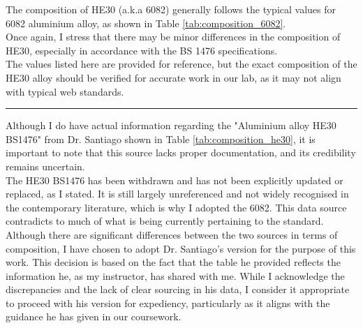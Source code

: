\documentclass{article}
\begin{document}
\hfill
\begin{minipage}{0.55\textwidth}
    The composition of HE30 (a.k.a 6082) generally follows the typical values for 6082 aluminium alloy, as shown in Table \ref{tab:composition_6082}.\\[1em]
    Once again, I stress that there may be minor differences in the composition of HE30, especially in accordance with the BS 1476 specifications.\\[1em] 
    The values listed here are provided for reference, but the exact composition of the HE30 alloy should be verified for accurate work in our lab, as it may not align with typical web standards.
    \vspace{1em}\hrule\vspace{1em}
    Although I do have actual information regarding the "Aluminium alloy HE30 BS1476" from Dr. Santiago shown in Table \ref{tab:composition_he30}, it is important to note that this source lacks proper documentation, and its credibility remains uncertain.\\[1em]
    The HE30 BS1476 has been withdrawn and has not been explicitly updated or replaced, as I stated. It is still largely unreferenced and not widely recognised in the contemporary literature, which is why I adopted the 6082. This data source contradicts to much of what is being currently pertaining to the standard.\\[1em]
    Although there are significant differences between the two sources in terms of composition, I have chosen to adopt Dr. Santiago's version for the purpose of this work. This decision is based on the fact that the table he provided reflects the information he, as my instructor, has shared with me. While I acknowledge the discrepancies and the lack of clear sourcing in his data, I consider it appropriate to proceed with his version for expediency, particularly as it aligns with the guidance he has given in our coursework.
\end{minipage}\\

\raggedright
\end{document}

